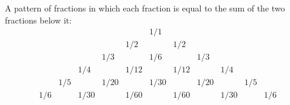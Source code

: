 A pattern of fractions in which each fraction is equal to the sum of the
two fractions below it:
\[ 
\begin{array}{ccccccccccc} 
& & & & & 1/1 & & & & & \\
& & & & 1/2 & & 1/2 & & & & \\
& & & 1/3 & & 1/6 & & 1/3 & & & \\
& & 1/4 & & 1/12 & & 1/12 & & 1/4 & & \\
& 1/5 & & 1/20 & & 1/30 & & 1/20 & & 1/5 & \\
1/6 & & 1/30 & & 1/60 & & 1/60 & & 1/30 & & 1/6 
\end{array} 
\]